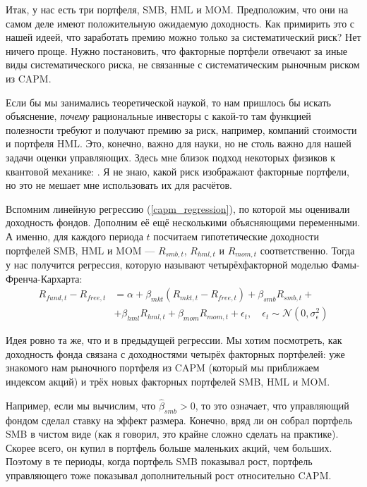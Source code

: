 Итак, у нас есть три портфеля, SMB, HML и MOM. Предположим, что они на самом 
деле имеют положительную ожидаемую доходность. Как примирить это с нашей идеей, 
что заработать премию можно только за систематический риск? Нет ничего проще. 
Нужно постановить, что факторные портфели отвечают за иные виды систематического 
риска, не связанные с систематическим рыночным риском из CAPM.

Если бы мы занимались теоретической наукой, то нам пришлось бы искать 
объяснение, \emph{почему} рациональные инвесторы с какой-то там функцией 
полезности требуют и получают премию за риск, например, компаний стоимости и 
портфеля HML. Это, конечно, важно для науки, но не столь важно для нашей задачи 
оценки управляющих. Здесь мне близок подход некоторых физиков к квантовой 
механике: . Я не знаю, 
какой риск изображают факторные портфели, но это не мешает мне использовать их 
для расчётов.

Вспомним линейную регрессию (\ref{capm_regression}), по которой мы оценивали 
доходность фондов. Дополним её ещё несколькими объясняющими переменными. А 
именно, для каждого периода $t$ посчитаем гипотетические доходности портфелей 
SMB, HML и MOM --- $R_{smb,t}$, $R_{hml,t}$ и $R_{mom,t}$ соответственно. Тогда 
у нас получится регрессия, которую называют четырёхфакторной моделью 
Фамы-Френча-Кархарта:
\begin{align}
\nonumber
R_{fund,t} - R_{free,t} &= \alpha
+ \beta_{mkt}\left(R_{mkt,t} - R_{free,t}\right) 
+ \beta_{smb}R_{smb,t} + \\
&+ \beta_{hml}R_{hml,t}
+ \beta_{mom}R_{mom,t}
+ \epsilon_t,
\quad
\epsilon_t \sim \mathcal{N}(0, \sigma_{\epsilon}^2)
\label{four_factor_regression}
\end{align}

Идея ровно та же, что и в предыдущей регрессии. Мы хотим посмотреть, как 
доходность фонда связана с доходностями четырёх факторных портфелей: уже 
знакомого нам рыночного портфеля из CAPM (который мы приближаем индексом акций) 
и трёх новых факторных портфелей SMB, HML и MOM.

Например, если мы вычислим, что $\hat{\beta}_{smb} > 0$, то это означает, что 
управляющий фондом сделал ставку на эффект размера. Конечно, вряд ли он собрал 
портфель SMB в чистом виде (как я говорил, это крайне сложно сделать на 
практике). Скорее всего, он купил в портфель больше маленьких акций, чем 
больших. Поэтому в те периоды, когда портфель SMB показывал рост, портфель 
управляющего тоже показывал дополнительный рост относительно CAPM.

